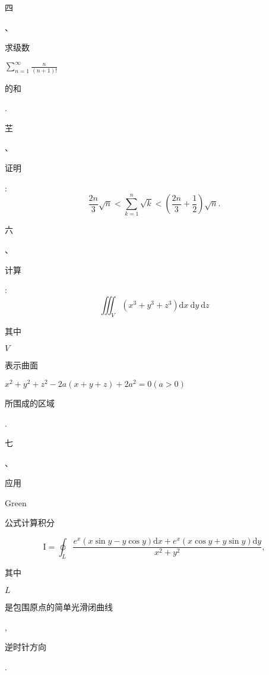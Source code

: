 \documentclass[10pt]{article}
\begin{document}
\begin{CJK}{UTF8}{mj}四\end{CJK}、\begin{CJK}{UTF8}{mj}求级数\end{CJK} $\sum_{n=1}^{\infty} \frac{n}{(n+1) !}$ \begin{CJK}{UTF8}{mj}的和\end{CJK}.

\begin{CJK}{UTF8}{mj}芏\end{CJK}、\begin{CJK}{UTF8}{mj}证明\end{CJK}:
$$
\frac{2 n}{3} \sqrt{n}<\sum_{k=1}^{n} \sqrt{k}<\left(\frac{2 n}{3}+\frac{1}{2}\right) \sqrt{n} .
$$
\begin{CJK}{UTF8}{mj}六\end{CJK}、\begin{CJK}{UTF8}{mj}计算\end{CJK}:
$$
\iiint_{V}\left(x^{3}+y^{3}+z^{3}\right) \mathrm{d} x \mathrm{~d} y \mathrm{~d} z
$$
\begin{CJK}{UTF8}{mj}其中\end{CJK} $V$ \begin{CJK}{UTF8}{mj}表示曲面\end{CJK} $x^{2}+y^{2}+z^{2}-2 a(x+y+z)+2 a^{2}=0(a>0)$ \begin{CJK}{UTF8}{mj}所围成的区域\end{CJK}.

\begin{CJK}{UTF8}{mj}七\end{CJK}、\begin{CJK}{UTF8}{mj}应用\end{CJK} Green \begin{CJK}{UTF8}{mj}公式计算积分\end{CJK}
$$
\mathrm{I}=\oint_{L} \frac{e^{x}(x \sin y-y \cos y) \mathrm{d} x+e^{x}(x \cos y+y \sin y) \mathrm{d} y}{x^{2}+y^{2}},
$$
\begin{CJK}{UTF8}{mj}其中\end{CJK} $L$ \begin{CJK}{UTF8}{mj}是包围原点的简单光滑闭曲线\end{CJK}, \begin{CJK}{UTF8}{mj}逆时针方向\end{CJK}.
\end{document}
